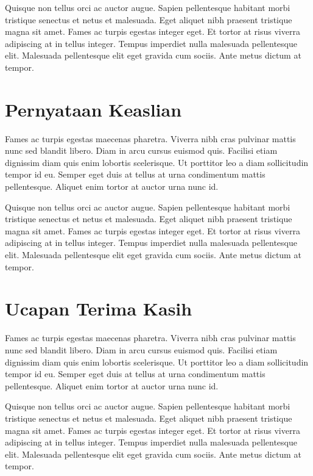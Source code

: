 \documentclass[12pt,hidelinks]{report}
\begin{document}
Quisque non tellus orci ac auctor augue. Sapien pellentesque habitant morbi tristique senectus et netus et malesuada. Eget aliquet nibh praesent tristique magna sit amet. Fames ac turpis egestas integer eget. Et tortor at risus viverra adipiscing at in tellus integer. Tempus imperdiet nulla malesuada pellentesque elit. Malesuada pellentesque elit eget gravida cum sociis. Ante metus dictum at tempor.
 
\chapter*{Pernyataan Keaslian}
Fames ac turpis egestas maecenas pharetra. Viverra nibh cras pulvinar mattis nunc sed blandit libero. Diam in arcu cursus euismod quis. Facilisi etiam dignissim diam quis enim lobortis scelerisque. Ut porttitor leo a diam sollicitudin tempor id eu. Semper eget duis at tellus at urna condimentum mattis pellentesque. Aliquet enim tortor at auctor urna nunc id.

Quisque non tellus orci ac auctor augue. Sapien pellentesque habitant morbi tristique senectus et netus et malesuada. Eget aliquet nibh praesent tristique magna sit amet. Fames ac turpis egestas integer eget. Et tortor at risus viverra adipiscing at in tellus integer. Tempus imperdiet nulla malesuada pellentesque elit. Malesuada pellentesque elit eget gravida cum sociis. Ante metus dictum at tempor.
 
\chapter*{Ucapan Terima Kasih}
Fames ac turpis egestas maecenas pharetra. Viverra nibh cras pulvinar mattis nunc sed blandit libero. Diam in arcu cursus euismod quis. Facilisi etiam dignissim diam quis enim lobortis scelerisque. Ut porttitor leo a diam sollicitudin tempor id eu. Semper eget duis at tellus at urna condimentum mattis pellentesque. Aliquet enim tortor at auctor urna nunc id.

Quisque non tellus orci ac auctor augue. Sapien pellentesque habitant morbi tristique senectus et netus et malesuada. Eget aliquet nibh praesent tristique magna sit amet. Fames ac turpis egestas integer eget. Et tortor at risus viverra adipiscing at in tellus integer. Tempus imperdiet nulla malesuada pellentesque elit. Malesuada pellentesque elit eget gravida cum sociis. Ante metus dictum at tempor.
 
\end{document}
